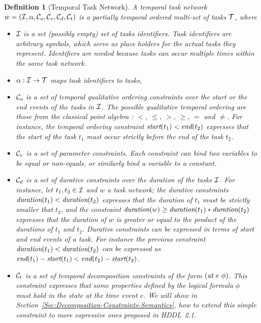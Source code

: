 \documentclass[letterpaper]{article} %
\newtheorem{definition}{Definition}
\newcommand{\at}{\text{\it at}}
\newcommand{\duration}{\text{\it duration}}
\newcommand{\tstart}{\text{\it start}}
\newcommand{\tend}{\text{\it end}}
\begin{document}
\begin{definition}[Temporal Task Network]
A temporal task network $w = ({\cal{I}}, \alpha, {\cal{C}}_o, {\cal{C}}_v, {\cal{C}}_d, {\cal{C}}_t)$ is a partially temporal ordered multi-set of tasks $\cal{T}$, where
\begin{itemize}

    \item $\cal{I}$ is a set (possibly empty) set of tasks identifiers. Task identifiers are arbitrary symbols, which serve as place holders for the actual tasks they represent. Identifiers are needed because tasks can occur multiple times within the same task network.

    \item $\alpha: {\cal{I}} \rightarrow {\cal{T}}$ maps task identifiers to tasks,

    \item ${\cal{C}}_o$ is a set of temporal qualitative ordering constraints over the start or the end events of the tasks in $\cal{I}$. The possible qualitative temporal ordering are those from the classical point algebra \cite{broxvall03}: $<$, $\leq$, $>$, $\geq$, $=$ and $\neq$. For instance, the temporal ordering constraint $\tstart(t_1) < \tend(t_2)$ expresses that the start of the task $t_1$ must occur strictly  before the end of the task $t_2$.

    \item ${\cal{C}}_v$ is a set of parameter constraints. Each constraint can bind two variables to be equal or non-equals, or similarly bind a variable to a constant. %

    \item ${\cal{C}}_d$ is a set of durative constraints over the duration of the tasks $\cal{I}$. For instance, let $t_1, t_2 \in {\cal{I}}$ and $w$ a task network; the durative constraints $\duration(t_1) < \duration(t_2)$ expresses that the duration of $t_1$ must be strictly smaller that $t_2$, and the constraint $\duration(w) \geq \duration(t_1) * \duration(t_2)$ expresses that the duration of $w$ is greater or equal to the product of the durations of $t_1$ and $t_2$. Durative constraints can be expressed in terms of start and end events of a task. For instance the previous constraint $\duration(t_1) < \duration(t_2)$ can be expressed as  $\tend(t_1) - \tstart(t_1) < \tend(t_2) - \tstart(t_2)$.

    \item ${\cal{C}}_t$ is a set of temporal decomposition constraints of the form $(\at \ e \ \phi)$. This constraint expresses that some properties defined by the logical formula $\phi$ must hold in the state at the time event $e$. We will show in Section~\ref{Sec:Decomposition-Constraints-Semantics}, how to extend this simple constraint to more expressive ones proposed in HDDL~2.1.
   \end{itemize}
\end{definition}
\end{document}
